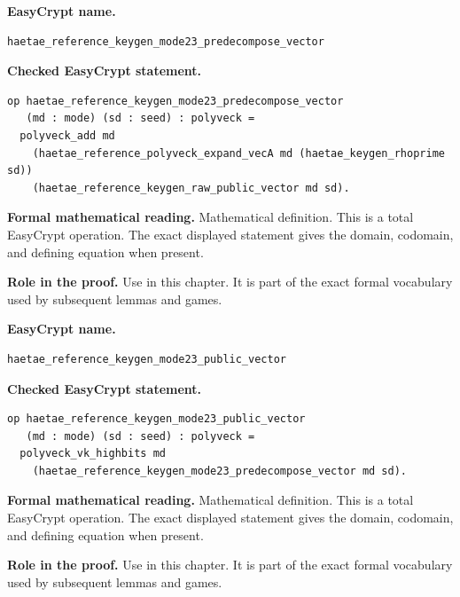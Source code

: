 \begin{formaldefinition}
\noindent\textbf{EasyCrypt name.}
\begin{lstlisting}[language=EasyCrypt,basicstyle=\ttfamily\scriptsize]
haetae_reference_keygen_mode23_predecompose_vector
\end{lstlisting}
\noindent\textbf{Checked EasyCrypt statement.}
\begin{lstlisting}[language=EasyCrypt,basicstyle=\ttfamily\scriptsize]
op haetae_reference_keygen_mode23_predecompose_vector
   (md : mode) (sd : seed) : polyveck =
  polyveck_add md
    (haetae_reference_polyveck_expand_vecA md (haetae_keygen_rhoprime sd))
    (haetae_reference_keygen_raw_public_vector md sd).
\end{lstlisting}
\noindent\textbf{Formal mathematical reading.}
Mathematical definition. This is a total EasyCrypt operation.  The exact displayed statement gives the domain, codomain, and defining equation when present.

\noindent\textbf{Role in the proof.}
Use in this chapter. It is part of the exact formal vocabulary used by subsequent lemmas and games.

\end{formaldefinition}

\begin{formaldefinition}
\noindent\textbf{EasyCrypt name.}
\begin{lstlisting}[language=EasyCrypt,basicstyle=\ttfamily\scriptsize]
haetae_reference_keygen_mode23_public_vector
\end{lstlisting}
\noindent\textbf{Checked EasyCrypt statement.}
\begin{lstlisting}[language=EasyCrypt,basicstyle=\ttfamily\scriptsize]
op haetae_reference_keygen_mode23_public_vector
   (md : mode) (sd : seed) : polyveck =
  polyveck_vk_highbits md
    (haetae_reference_keygen_mode23_predecompose_vector md sd).
\end{lstlisting}
\noindent\textbf{Formal mathematical reading.}
Mathematical definition. This is a total EasyCrypt operation.  The exact displayed statement gives the domain, codomain, and defining equation when present.

\noindent\textbf{Role in the proof.}
Use in this chapter. It is part of the exact formal vocabulary used by subsequent lemmas and games.

\end{formaldefinition}


